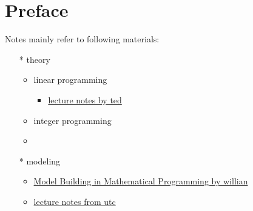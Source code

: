 \chapter*{Preface}


Notes mainly refer to following materials:
\begin{itemize}
    \item[*] theory
    \begin{itemize}
        \item linear programming
            \begin{itemize}
                \item \href{https://coral.ise.lehigh.edu/~ted/teaching/ie406/}{lecture notes by ted}
            \end{itemize}
        \item integer programming
        \item 
    \end{itemize}
    \item[*] modeling
    \begin{itemize}
        \item \href{}{Model Building in Mathematical Programming by willian}
        \item \href{https://www.hds.utc.fr/~dnace/dokuwiki/_media/fr/lp-modelling_upt_p2021.pdf}{lecture notes from utc}
    \end{itemize}
\end{itemize}








